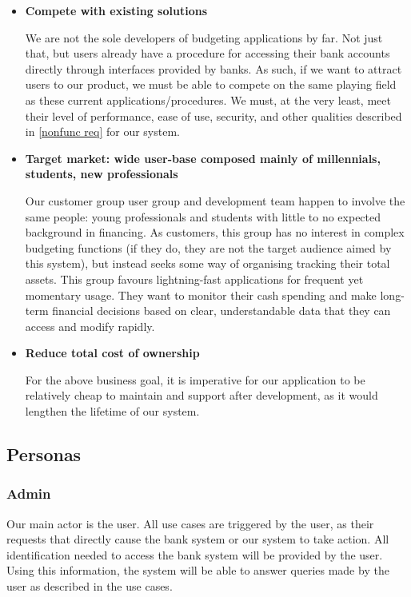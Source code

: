\documentclass[11pt]{article}
\newcounter{use case ID}
\newcounter{req ID}
\begin{document}
\begin{itemize}
    \item \textbf{Compete with existing solutions}

        We are not the sole developers of budgeting applications by far. Not just that, but users already have a procedure for accessing their bank accounts directly through interfaces provided by banks. As such, if we want to attract users to our product, we must be able to compete on the same playing field as these current applications/procedures. We must, at the very least, meet their level of performance, ease of use, security, and other qualities described in \ref{nonfunc req} for our system.

    \item \textbf{Target market: wide user-base composed mainly of millennials, students, new professionals}

        Our customer group user group and development team happen to involve the same people: young professionals and students with little to no expected background in financing. As customers, this group has no interest in complex budgeting functions (if they do, they are not the target audience aimed by this system), but instead seeks some way of organising tracking their total assets. This group favours lightning-fast applications for frequent yet momentary usage. They want to monitor their cash spending and make long-term financial decisions based on clear, understandable data that they can access and modify rapidly.

    \item \textbf{Reduce total cost of ownership}

        For the above business goal, it is imperative for our application to be relatively cheap to maintain and support after development, as it would lengthen the lifetime of our system.

\end{itemize}

\subsection{Personas} \label{actors}
\subsubsection{Admin}
Our main actor is the user. All use cases are triggered by the user, as their requests that directly cause the bank system or our system to take action. All identification needed to access the bank system will be provided by the user. Using this information, the system will be able to answer queries made by the user as described in the use cases.
\end{document}
